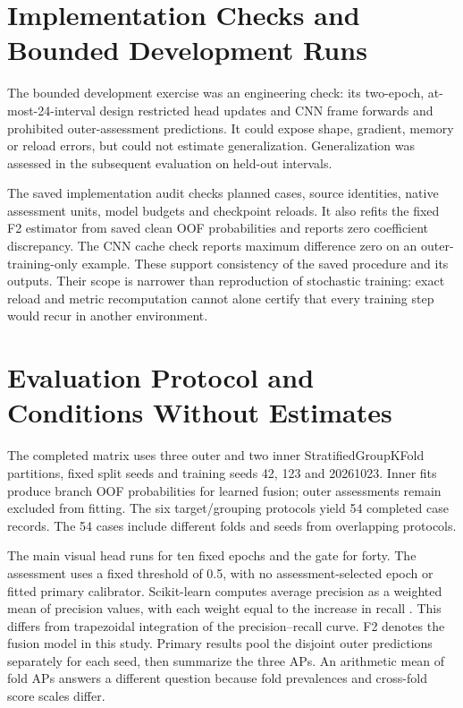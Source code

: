 \section{Implementation Checks and Bounded Development Runs}
The bounded development exercise was an engineering check: its two-epoch, at-most-24-interval design restricted head updates and CNN frame forwards and prohibited outer-assessment predictions. It could expose shape, gradient, memory or reload errors, but could not estimate generalization. Generalization was assessed in the subsequent evaluation on held-out intervals.

The saved implementation audit checks planned cases, source identities, native assessment units, model budgets and checkpoint reloads. It also refits the fixed F2 estimator from saved clean OOF probabilities and reports zero coefficient discrepancy. The CNN cache check reports maximum difference zero on an outer-training-only example. These support consistency of the saved procedure and its outputs. Their scope is narrower than reproduction of stochastic training: exact reload and metric recomputation cannot alone certify that every training step would recur in another environment.

\section{Evaluation Protocol and Conditions Without Estimates}
The completed matrix uses three outer and two inner StratifiedGroupKFold partitions, fixed split seeds and training seeds 42, 123 and 20261023. Inner fits produce branch OOF probabilities for learned fusion; outer assessments remain excluded from fitting. The six target/grouping protocols yield 54 completed case records. The 54 cases include different folds and seeds from overlapping protocols.

The main visual head runs for ten fixed epochs and the gate for forty. The assessment uses a fixed threshold of 0.5, with no assessment-selected epoch or fitted primary calibrator. Scikit-learn computes average precision as a weighted mean of precision values, with each weight equal to the increase in recall \citep{Pedregosa2011ScikitLearn}. This differs from trapezoidal integration of the precision--recall curve. F2 denotes the fusion model in this study. Primary results pool the disjoint outer predictions separately for each seed, then summarize the three APs. An arithmetic mean of fold APs answers a different question because fold prevalences and cross-fold score scales differ.


